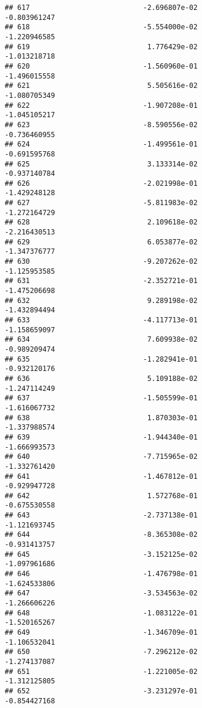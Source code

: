 \documentclass[
]{article}
\begin{document}
\begin{verbatim}
## 617                           -2.696807e-02               -0.803961247
## 618                           -5.554000e-02               -1.220946585
## 619                            1.776429e-02               -1.013218718
## 620                           -1.560960e-01               -1.496015558
## 621                            5.505616e-02               -1.080705349
## 622                           -1.907208e-01               -1.045105217
## 623                           -8.590556e-02               -0.736460955
## 624                           -1.499561e-01               -0.691595768
## 625                            3.133314e-02               -0.937140784
## 626                           -2.021998e-01               -1.429248128
## 627                           -5.811983e-02               -1.272164729
## 628                            2.109618e-02               -2.216430513
## 629                            6.053877e-02               -1.347376777
## 630                           -9.207262e-02               -1.125953585
## 631                           -2.352721e-01               -1.475206698
## 632                            9.289198e-02               -1.432894494
## 633                           -4.117713e-01               -1.158659097
## 634                            7.609938e-02               -0.989209474
## 635                           -1.282941e-01               -0.932120176
## 636                            5.109188e-02               -1.247114249
## 637                           -1.505599e-01               -1.616067732
## 638                            1.870303e-01               -1.337988574
## 639                           -1.944340e-01               -1.666993573
## 640                           -7.715965e-02               -1.332761420
## 641                           -1.467812e-01               -0.929947728
## 642                            1.572768e-01               -0.675530558
## 643                           -2.737138e-01               -1.121693745
## 644                           -8.365308e-02               -0.931413757
## 645                           -3.152125e-02               -1.097961686
## 646                           -1.476798e-01               -1.624533806
## 647                           -3.534563e-02               -1.266606226
## 648                           -1.083122e-01               -1.520165267
## 649                           -1.346709e-01               -1.106532041
## 650                           -7.296212e-02               -1.274137087
## 651                           -1.221005e-02               -1.312125805
## 652                           -3.231297e-01               -0.854427168

\end{verbatim}
\end{document}

